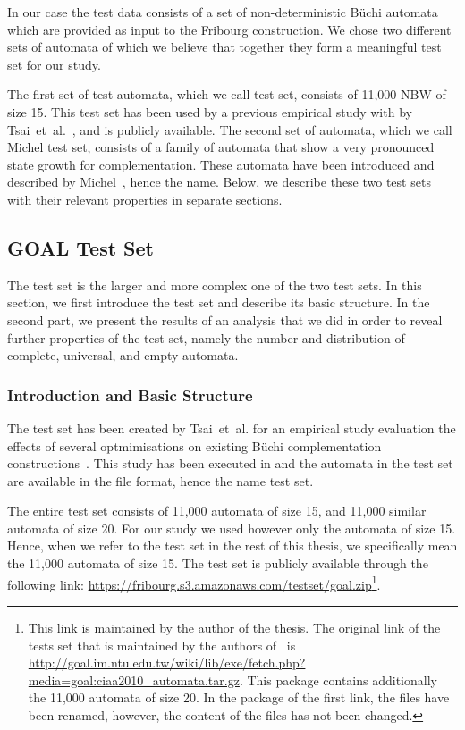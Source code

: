 In our case the test data consists of a set of non-deterministic Büchi automata which are provided as input to the Fribourg construction. We chose two different sets of automata of which we believe that together they form a meaningful test set for our study.

The first set of test automata, which we call \goal{} test set, consists of 11,000 NBW of size 15. This test set has been used by a previous empirical study with \goal{} by Tsai~et~al.~\cite{2010_tsai}, and is publicly available. The second set of automata, which we call Michel test set, consists of a family of automata that show a very pronounced state growth for complementation. These automata have been introduced and described by Michel~\cite{michel1988}, hence the name. Below, we describe these two test sets with their relevant properties in separate sections.


\subsection{GOAL Test Set}
\label{4_goal_testset}
The \goal{} test set is the larger and more complex one of the two test sets. In this section, we first introduce the \goal{} test set and describe its basic structure. In the second part, we present the results of an analysis that we did in order to reveal further properties of the \goal{} test set, namely the number and distribution of complete, universal, and empty automata.

\subsubsection{Introduction and Basic Structure}
The \goal{} test set has been created by Tsai~et~al. for an empirical study evaluation the effects of several optmimisations on existing Büchi complementation constructions~\cite{2010_tsai}. This study has been executed in \goal{} and the automata in the test set are available in the \goal{} file format, hence the name \goal{} test set.

The entire test set consists of 11,000 automata of size 15, and 11,000 similar automata of size 20. For our study we used however only the automata of size 15. Hence, when we refer to the \goal{} test set in the rest of this thesis, we specifically mean the 11,000 automata of size 15. The \goal{} test set is publicly available through the following link: \url{https://fribourg.s3.amazonaws.com/testset/goal.zip}\footnote{This link is maintained by the author of the thesis. The original link of the \goal{} tests set that is maintained by the authors of~\cite{2010_tsai} is \url{http://goal.im.ntu.edu.tw/wiki/lib/exe/fetch.php?media=goal:ciaa2010_automata.tar.gz}. This package contains additionally the 11,000 automata of size 20. In the package of the first link, the files have been renamed, however, the content of the files has not been changed.}.

